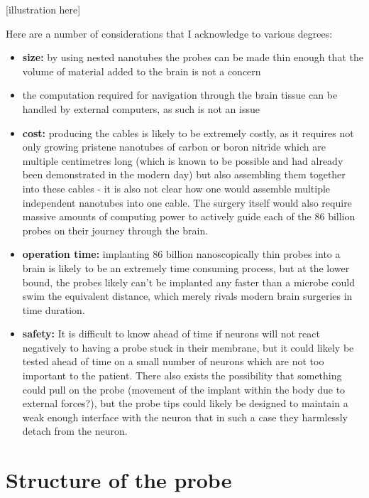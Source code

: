 \documentclass[a4paper]{article}
\begin{document}
    \medskip
    
    [illustration here]
    
    \medskip
    
    Here are a number of considerations that I acknowledge to various degrees:
    
    \begin{itemize}
        \item \textbf{size:} by using nested nanotubes the probes can be made thin enough that the volume of material added to the brain is not a concern
        
        \item the computation required for navigation through the brain tissue can be handled by external computers, as such is not an issue
        
        \item \textbf{cost:} producing the cables is likely to be extremely costly, as it requires not only growing pristene nanotubes of carbon or boron nitride which are multiple centimetres long (which is known to be possible and had already been demonstrated in the modern day) but also assembling them together into these cables - it is also not clear how one would assemble multiple independent nanotubes into one cable. The surgery itself would also require massive amounts of computing power to actively guide each of the 86 billion probes on their journey through the brain.
        
        \item \textbf{operation time:} implanting 86 billion nanoscopically thin probes into a brain is likely to be an extremely time consuming process, but at the lower bound, the probes likely can't be implanted any faster than a microbe could swim the equivalent distance, which merely rivals modern brain surgeries in time duration.
        
        \item \textbf{safety:} It is difficult to know ahead of time if neurons will not react negatively to having a probe stuck in their membrane, but it could likely be tested ahead of time on a small number of neurons which are not too important to the patient. There also exists the possibility that something could pull on the probe (movement of the implant within the body due to external forces?), but the probe tips could likely be designed to maintain a weak enough interface with the neuron that in such a case they harmlessly detach from the neuron.
    \end{itemize}
	
    \pagebreak
    
    \section{Structure of the probe}
    
\end{document}
